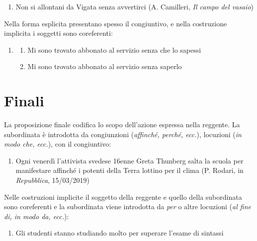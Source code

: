 \documentclass[
  a4paper,
  twoside,
  11pt,
  chapterprefix=false,
  bibliography=totocnumbered,
  listof=flat]{scrbook}
\providecommand{\tightlist}{%
  \setlength{\itemsep}{0pt}\setlength{\parskip}{0pt}}
\begin{document}
\begin{enumerate}
\def\labelenumi{(\arabic{enumi})}
\setcounter{enumi}{99}
\tightlist
\item
  Non si allontani da Vigata senza avvertirci (A. Camilleri, \emph{Il campo del vasaio})
\end{enumerate}

Nella forma esplicita presentano spesso il congiuntivo, e nella costruzione implicita i soggetti sono coreferenti:

\begin{enumerate}
\def\labelenumi{(\arabic{enumi})}
\setcounter{enumi}{100}
\item
  \begin{enumerate}
  \def\labelenumii{\alph{enumii}.}
  \tightlist
  \item
    Mi sono trovato abbonato al servizio senza che lo sapessi
  \item
    Mi sono trovato abbonato al servizio senza saperlo
  \end{enumerate}
\end{enumerate}

\hypertarget{finali}{%
\section{Finali}\label{finali}}

La proposizione finale codifica lo scopo dell'azione espressa nella reggente. La subordinata è introdotta da congiunzioni (\emph{affinché, perché, ecc.}), locuzioni (\emph{in modo che, ecc.}), con il congiuntivo:

\begin{enumerate}
\def\labelenumi{(\arabic{enumi})}
\setcounter{enumi}{101}
\tightlist
\item
  Ogni venerdì l'attivista svedese 16enne Greta Thunberg salta la scuola per manifestare affinché i potenti della Terra lottino per il clima (P. Rodari, in \emph{Repubblica}, 15/03/2019)
\end{enumerate}

Nelle costruzioni implicite il soggetto della reggente e quello della subordinata sono coreferenti e la subordinata viene introdotta da \emph{per} o altre locuzioni (\emph{al fine di, in modo da, ecc.}):

\begin{enumerate}
\def\labelenumi{(\arabic{enumi})}
\setcounter{enumi}{102}
\tightlist
\item
  Gli studenti stanno studiando molto per superare l'esame di sintassi
\end{enumerate}
\end{document}
